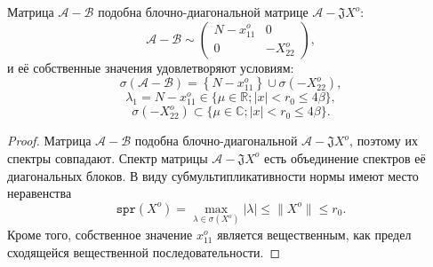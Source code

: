 \begin{lem}
Матрица \( \mathcal{A} - \mathcal{B} \) подобна блочно-диагональной матрице \( \mathcal{A} - \mathfrak{J} X^o \):
\[ \mathcal{A} - \mathcal{B} \sim
\begin{pmatrix}
N - x_{11}^o & 0 \\
0 & -X_{22}^o
\end{pmatrix}, \]
и её собственные значения удовлетворяют условиям:
\[ \sigma\left(\mathcal{A} - \mathcal{B}\right) = \left\{N-x_{11}^o\right\}\cup \sigma\left(-X_{22}^o\right), \]
\[ \lambda_1 = N-x_{11}^o \in \{ \mu\in\mathbb{R}; \lvert x \rvert < r_0 \leq 4\beta \}, \]
\[ \sigma\left(-X_{22}^o\right) \subset \{ \mu\in\mathbb{C}; \lvert x \rvert < r_0 \leq 4\beta \}. \]
\end{lem}
\begin{proof}
    Матрица \( \mathcal{A} - \mathcal{B} \) подобна блочно-диагональной \( \mathcal{A} - \mathfrak{J} X^o \),
    поэтому их спектры совпадают.
    Спектр матрицы \( \mathcal{A} - \mathfrak{J} X^o \) есть объединение спектров её диагональных блоков.
    В виду субмультипликативности нормы имеют место неравенства
    \[ \mathtt{spr}(X^o) = \max_{\lambda\in\sigma(X^o)}\lvert\lambda\rvert \leq \|X^o\| \leq r_0. \]
    Кроме того, собственное значение \( x_{11}^o \) является вещественным, как предел сходящейся вещественной последовательности.
\end{proof}
